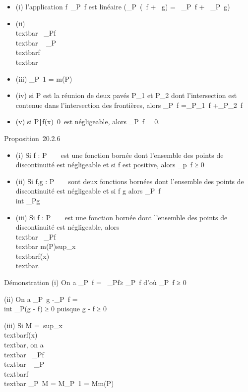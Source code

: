 \documentclass[]{article}
\begin{document}
\begin{itemize}
\itemsep1pt\parskip0pt
\item
  (i) l'application
  f\mapsto~\int  \_P~f
  est linéaire (\int  \_P~(\alpha~f + \beta~g) =
  \alpha~\int  \_P~f +
  \beta~\int  \_P~g)
\item
  (ii) \\textbar{}\int ~
  \_Pf\\textbar{} \leq\int ~
  \_P\\textbar{}f\\textbar{}
\item
  (iii) \int  \_P~1 = m(P)
\item
  (iv) si P est la réunion de deux pavés P\_1 et P\_2
  dont l'intersection est contenue dans l'intersection des frontières,
  alors \int  \_P~f
  =\int  \_P\_1~f
  +\int  \_P\_2~f
\item
  (v) si \x \in
  P∣f(x)\mathrel\neq~0\
  est négligeable, alors \int  \_P~f = 0.
\end{itemize}

Proposition~20.2.6

\begin{itemize}
\itemsep1pt\parskip0pt
\item
  (i) Si f : P \rightarrow~ ~ est une fonction bornée dont l'ensemble des points de
  discontinuité est négligeable et si f est positive, alors
  \int  \_p~f ≥ 0
\item
  (ii) Si f,g : P \rightarrow~ ~ sont deux fonctions bornées dont l'ensemble des
  points de discontinuité est négligeable et si f \leq g alors
  \int  \_P~f \leq\\int
   \_Pg
\item
  (iii) Si f : P \rightarrow~ ~ est une fonction bornée dont l'ensemble des points
  de discontinuité est négligeable, alors
  \\textbar{}\int ~
  \_Pf\\textbar{} \leq
  m(P)sup\_x\inP~\\textbar{}f(x)\\textbar{}.
\end{itemize}

Démonstration (i) On a \int  \_P~f
=\int ~
\_P\textbar{}f\textbar{}≥\left
\textbar{}\int  \_P~f\right
\textbar{} d'où \int  \_P~f ≥ 0

(ii) On a \int  \_P~g
-\int  \_P~f =\\int
 \_P(g - f) ≥ 0 puisque g - f ≥ 0

(iii) Si M =\
sup\_x\inP\\textbar{}f(x)\\textbar{},
on a \\textbar{}\int ~
\_Pf\\textbar{} \leq\int ~
\_P\\textbar{}f\\textbar{}
\leq\int  \_P~M =
M\int  \_P~1 = Mm(P)
\end{document}
